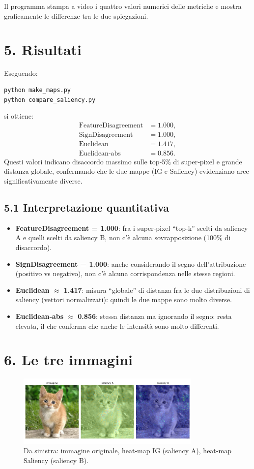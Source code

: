 \documentclass[a4paper,11pt]{article}
\begin{document}
Il programma stampa a video i quattro valori numerici delle metriche e mostra graficamente le differenze tra le due spiegazioni.

\section*{5. Risultati}
Eseguendo:
\begin{verbatim}
python make_maps.py
python compare_saliency.py
\end{verbatim}
si ottiene:
\[
\begin{aligned}
\text{FeatureDisagreement} &= 1.000,\\ 
\text{SignDisagreement}    &= 1.000,\\
\text{Euclidean}           &= 1.417,\\
\text{Euclidean-abs}       &= 0.856.
\end{aligned}
\]
Questi valori indicano disaccordo massimo sulle top‐5\% di super‐pixel e grande distanza globale, confermando che le due mappe (IG e Saliency) evidenziano aree significativamente diverse.

\subsection*{5.1 Interpretazione quantitativa}
\begin{itemize}
\item \textbf{FeatureDisagreement = 1.000}: fra i super‐pixel “top‐k” scelti da saliency A e quelli scelti da saliency B, non c’è alcuna sovrapposizione (100\% di disaccordo).
\item \textbf{SignDisagreement = 1.000}: anche considerando il segno dell’attribuzione (positivo vs negativo), non c’è alcuna corrispondenza nelle stesse regioni.
\item \textbf{Euclidean $\approx$ 1.417}: misura “globale” di distanza fra le due distribuzioni di saliency (vettori normalizzati): quindi le due mappe sono molto diverse.
\item \textbf{Euclidean‐abs $\approx$ 0.856}: stessa distanza ma ignorando il segno: resta elevata, il che conferma che anche le intensità sono molto differenti.
\end{itemize}

\section*{6. Le tre immagini}
\begin{figure}[htbp]
\centering
\includegraphics[height=3.5cm]{saliency.png}\qquad
\caption{Da sinistra: immagine originale, heat‐map IG (saliency A), heat‐map Saliency (saliency B).}
\label{fig:three_images}
\end{figure}
\end{document}
